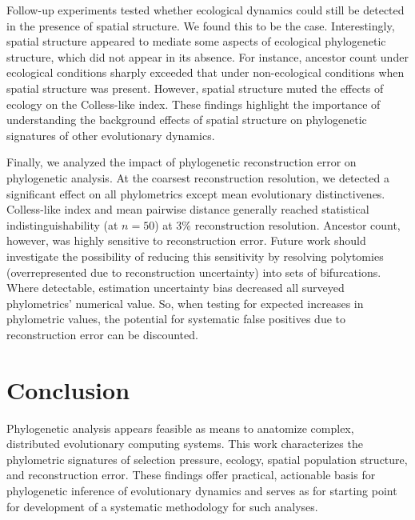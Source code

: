 Follow-up experiments tested whether ecological dynamics could still be detected in the presence of spatial structure.
We found this to be the case.
Interestingly, spatial structure appeared to mediate some aspects of ecological phylogenetic structure, which did not appear in its absence.
For instance, ancestor count under ecological conditions sharply exceeded that under non-ecological conditions when spatial structure was present.
However, spatial structure muted the effects of ecology on the Colless-like index.
These findings highlight the importance of understanding the background effects of spatial structure on phylogenetic signatures of other evolutionary dynamics.

Finally, we analyzed the impact of phylogenetic reconstruction error on phylogenetic analysis.
At the coarsest reconstruction resolution, we detected a significant effect on all phylometrics except mean evolutionary distinctivenes.
Colless-like index and mean pairwise distance generally reached statistical indistinguishability (at $n=50$) at 3\% reconstruction resolution.
Ancestor count, however, was highly sensitive to reconstruction error.
Future work should investigate the possibility of reducing this sensitivity by resolving polytomies (overrepresented due to reconstruction uncertainty) into sets of bifurcations.
Where detectable, estimation uncertainty bias decreased all surveyed phylometrics' numerical value.
So, when testing for expected increases in phylometric values, the potential for systematic false positives due to reconstruction error can be discounted.

\vspace{-1.5ex}
\section{Conclusion}

Phylogenetic analysis appears feasible as means to anatomize complex, distributed evolutionary computing systems.
This work characterizes the phylometric signatures of selection pressure, ecology, spatial population structure, and reconstruction error.
These findings offer practical, actionable basis for phylogenetic inference of evolutionary dynamics and serves as for starting point for development of a systematic methodology for such analyses.
